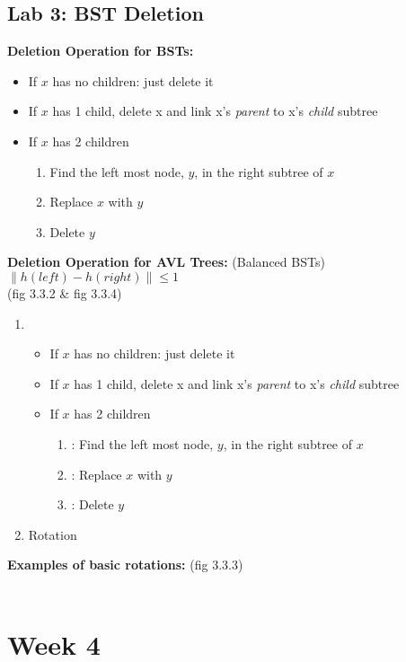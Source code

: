 \documentclass{article}
\begin{document}
		\subsection{Lab 3: BST Deletion}
		\textbf{Deletion Operation for BSTs:}
		\begin{itemize}
			\item If $x$ has no children: just delete it
			\item If $x$ has 1 child, delete x and link x's \emph{parent} to x's \emph{child} subtree
			\item If $x$ has 2 children 
			\begin{enumerate}
				\item Find the left most node, $y$, in the right subtree of $x$ 
				\item Replace $x$ with $y$
				\item Delete $y$\\
			\end{enumerate}
		\end{itemize}
		\textbf{Deletion Operation for AVL Trees:} (Balanced BSTs)\\$\|h(left)-h(right)\|\le 1$\\ (fig 3.3.2 \& fig 3.3.4)
		\begin{enumerate}
		\item
		\begin{itemize}
			\item If $x$ has no children: just delete it
			\item If $x$ has 1 child, delete x and link x's \emph{parent} to x's \emph{child} subtree
			\item If $x$ has 2 children
			\begin{enumerate}
				\item: Find the left most node, $y$, in the right subtree of $x$ 
				\item: Replace $x$ with $y$
				\item: Delete $y$
			\end{enumerate}
		\end{itemize}
		\item Rotation\\
	\end{enumerate}
	\textbf{Examples of basic rotations: }(fig 3.3.3)\\\\
\section{Week 4}
\end{document}
